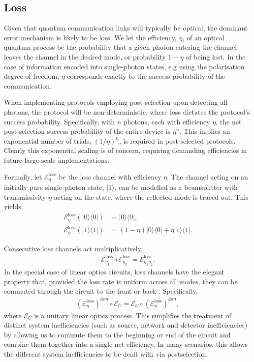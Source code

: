 \documentclass[aps,rmp,twocolumn,amsmath,amssymb,nofootinbib,superscriptaddress,longbibliography,floatfix]{revtex4-1}
\newcommand{\bra}[1]{\langle#1|}
\newcommand{\ket}[1]{|#1\rangle}
\begin{document}
%
%

\subsection{Loss} \label{sec:eff_err}

Given that quantum communication links will typically be optical, the dominant error mechanism is likely to be loss. We let the efficiency, $\eta$, of an optical quantum process be the probability that a given photon entering the channel leaves the channel in the desired mode, or probability \mbox{$1-\eta$} of being lost. In the case of information encoded into single-photon states, e.g using the polarisation degree of freedom, $\eta$ corresponds exactly to the success probability of the communication.

When implementing protocols employing post-selection upon detecting all photons, the protocol will be non-deterministic, where loss dictates the protocol's success probability. Specifically, with $n$ photons, each with efficiency $\eta$, the net post-selection success probability of the entire device is $\eta^n$. This implies an exponential number of trials, \mbox{$(1/\eta)^n$}, is required in post-selected protocols. Clearly this exponential scaling is of concern, requiring demanding efficiencies in future large-scale implementations.

Formally, let $\mathcal{E}^\mathrm{loss}_\eta$ be the loss channel with efficiency $\eta$. The channel acting on an initially pure single-photon state, $\ket{1}$, can be modelled as a beamsplitter with transmissivity $\eta$ acting on the state, where the reflected mode is traced out. This yields,
\begin{align}
\mathcal{E}^\mathrm{loss}_\eta(\ket{0}\bra{0}) &= \ket{0}\bra{0}, \nonumber \\
\mathcal{E}^\mathrm{loss}_\eta(\ket{1}\bra{1}) &= (1-\eta)\ket{0}\bra{0} + \eta\ket{1}\bra{1}.
\end{align}

Consecutive loss channels act multiplicatively,
\begin{align}
\mathcal{E}_{\eta_1}^\mathrm{loss} \circ \mathcal{E}_{\eta_2}^\mathrm{loss} = \mathcal{E}_{\eta_1 \eta_2}^\mathrm{loss}.
\end{align}
In the special case of linear optics circuits, loss channels have the elegant property that, provided the loss rate is uniform across all modes, they can be commuted through the circuit to the front or back \cite{???}. Specifically,
\begin{align}
(\mathcal{E}_{\eta}^\mathrm{loss})^{\otimes m} \circ \mathcal{E}_U = \mathcal{E}_U \circ (\mathcal{E}_{\eta}^\mathrm{loss})^{\otimes m},
\end{align}
where $\mathcal{E}_U$ is a unitary linear optics process. This simplifies the treatment of distinct system inefficiencies (such as source, network and detector inefficiencies) by allowing us to commute them to the beginning or end of the circuit and combine them together into a single net efficiency. In many scenarios, this allows the different system inefficiencies to be dealt with via postselection.
\end{document}
